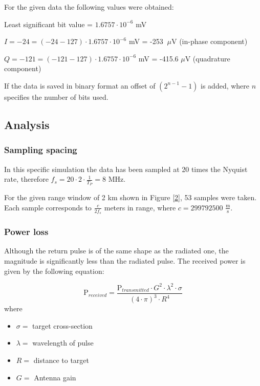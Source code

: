 For the given data the following values were obtained:

Least significant bit value = $1.6757\cdot 10^{-6}$ mV

$I=-24=(-24-127)\cdot 1.6757\cdot 10^{-6}$ mV = -253 $\ \mu $V (in-phase
component)

$Q=-121=(-121-127)\cdot 1.6757\cdot 10^{-6}$ mV = -415.6 $\mu $V (quadrature
component)

If the data is saved in binary format an offset of $\left( 2^{n-1}-1\right) $
is added, where $n$ specifies the number of bits used.

\subsection{Analysis}

\subsubsection{Sampling spacing}

In this specific simulation the data has been sampled at 20 times the
Nyquist rate, therefore $f_{s}=20\cdot 2\cdot \frac{1}{T_{P}}=8$ MHz.

For the given range window of 2 km shown in Figure \ref{2}, 53 samples were
taken. Each sample corresponds to $\frac{c}{2f_{s}}$ meters in range, where $%
c=299792500$ $\frac{\text{m}}{\text{s}}$.

\subsubsection{\protect\smallskip Power loss}

\smallskip Although the return pulse is of the same shape as the radiated
one, the magnitude is significantly less than the radiated pulse. The
received power is given by the following equation:

\begin{equation}
\text{P}_{received}=\frac{\text{P}_{transmitted}\cdot G^{2}\cdot \lambda
^{2}\cdot \sigma }{(4\cdot \pi )^{3}\cdot R^{4}}
\end{equation}
where

\begin{itemize}
\item  $\sigma =$ target cross-section

\item  $\lambda =$ wavelength of pulse

\item  $R=$ distance to target

\item  $G=$ Antenna gain
\end{itemize}

